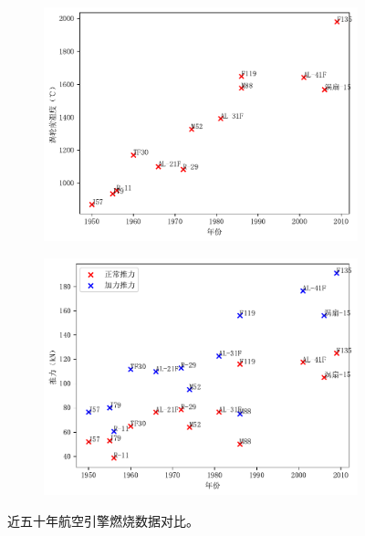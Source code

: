 \begin{figure}[!ht]
    \centering
    \begin{subfigure}{0.9\linewidth}
        \includegraphics[width=\linewidth]{combustor-tit.pdf}
    \end{subfigure}

    \begin{subfigure}{0.9\linewidth}
        \includegraphics[width=\linewidth]{combustor-thrust.pdf}
    \end{subfigure}
    \caption{近五十年航空引擎燃烧数据对比。}
    \label{fig:combustors}
\end{figure}

